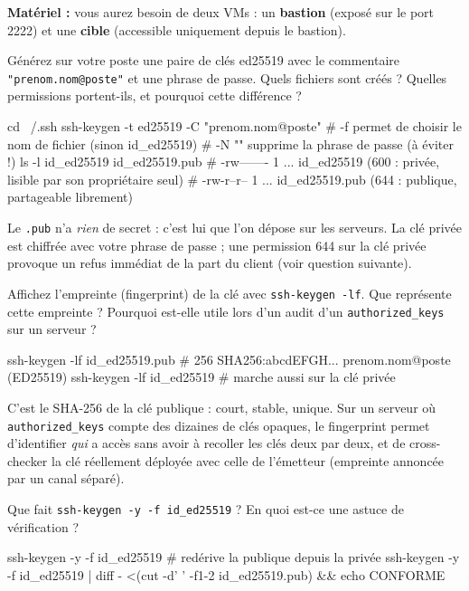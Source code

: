\documentclass[a4paper,10pt]{exam}
\begin{document}
\textbf{Matériel :} vous aurez besoin de deux VMs : un \textbf{bastion} (exposé sur le
port 2222) et une \textbf{cible} (accessible uniquement depuis le bastion).

\begin{questions}
\question Générez sur votre poste une paire de clés ed25519 avec le commentaire
\texttt{"prenom.nom@poste"} et une phrase de passe. Quels fichiers sont créés ?
Quelles permissions portent-ils, et pourquoi cette différence ?
\begin{solution}
\begin{bashcode}
cd ~/.ssh
ssh-keygen -t ed25519 -C "prenom.nom@poste"
# -f permet de choisir le nom de fichier (sinon id_ed25519)
# -N "" supprime la phrase de passe (à éviter !)
ls -l id_ed25519 id_ed25519.pub
# -rw------- 1 ... id_ed25519      (600 : privée, lisible par son propriétaire seul)
# -rw-r--r-- 1 ... id_ed25519.pub  (644 : publique, partageable librement)
\end{bashcode}
Le \texttt{.pub} n'a \emph{rien} de secret : c'est lui que l'on dépose sur les serveurs.
La clé privée est chiffrée avec votre phrase de passe ; une permission 644 sur la clé privée
provoque un refus immédiat de la part du client (voir question suivante).
\end{solution}
\question Affichez l'empreinte (fingerprint) de la clé avec \texttt{ssh-keygen -lf}.
Que représente cette empreinte ? Pourquoi est-elle utile lors d'un audit d'un
\texttt{authorized\_keys} sur un serveur ?
\begin{solution}
\begin{bashcode}
ssh-keygen -lf id_ed25519.pub
# 256 SHA256:abcdEFGH... prenom.nom@poste (ED25519)
ssh-keygen -lf id_ed25519     # marche aussi sur la clé privée
\end{bashcode}
C'est le SHA-256 de la clé publique : court, stable, unique. Sur un serveur où
\texttt{authorized\_keys} compte des dizaines de clés opaques, le fingerprint permet
d'identifier \emph{qui} a accès sans avoir à recoller les clés deux par deux, et de
cross-checker la clé réellement déployée avec celle de l'émetteur (empreinte annoncée
par un canal séparé).
\end{solution}
\question Que fait \texttt{ssh-keygen -y -f id\_ed25519} ? En quoi est-ce une astuce
de vérification ?
\begin{solution}
\begin{bashcode}
ssh-keygen -y -f id_ed25519        # redérive la publique depuis la privée
ssh-keygen -y -f id_ed25519 | diff - <(cut -d' ' -f1-2 id_ed25519.pub) && echo CONFORME

\end{bashcode}
\end{solution}
\end{questions}
\end{document}
